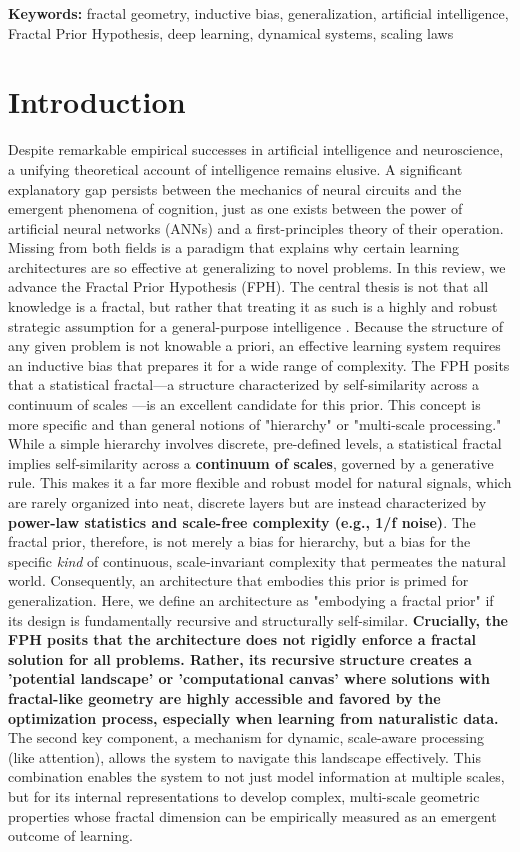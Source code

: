 \documentclass[11pt,a4paper]{article}
\newcommand{\keywords}[1]{%
\begin{center}
\small\textbf{Keywords:} #1
\end{center}
}
\begin{document}
\keywords{fractal geometry, inductive bias, generalization, artificial intelligence, Fractal Prior Hypothesis, deep learning, dynamical systems, scaling laws}

\section{Introduction}
Despite remarkable empirical successes in artificial intelligence and neuroscience, a unifying theoretical account of intelligence remains elusive. A significant explanatory gap persists between the mechanics of neural circuits and the emergent phenomena of cognition, just as one exists between the power of artificial neural networks (ANNs) and a first-principles theory of their operation. Missing from both fields is a paradigm that explains why certain learning architectures are so effective at generalizing to novel problems.
In this review, we advance the Fractal Prior Hypothesis (FPH). The central thesis is not that all knowledge is a fractal, but rather that treating it as such is a highly  and robust strategic assumption for a general-purpose intelligence \citep{marks-tarlow2020fractal}. Because the structure of any given problem is not knowable a priori, an effective learning system requires an inductive bias that prepares it for a wide range of complexity. The FPH posits that a statistical fractal—a structure characterized by self-similarity across a continuum of scales \citep{mandelbrot1983fractal}—is an excellent candidate for this prior. This concept is more specific and  than general notions of "hierarchy" or "multi-scale processing." While a simple hierarchy involves discrete, pre-defined levels, a statistical fractal implies self-similarity across a \textbf{continuum of scales}, governed by a generative rule. This makes it a far more flexible and robust model for natural signals, which are rarely organized into neat, discrete layers but are instead characterized by \textbf{power-law statistics and scale-free complexity (e.g., 1/f noise)}. The fractal prior, therefore, is not merely a bias for hierarchy, but a bias for the specific \textit{kind} of continuous, scale-invariant complexity that permeates the natural world.
Consequently, an architecture that embodies this prior is primed for generalization. Here, we define an architecture as "embodying a fractal prior" if its design is fundamentally recursive and structurally self-similar. \textbf{Crucially, the FPH posits that the architecture does not rigidly enforce a fractal solution for all problems. Rather, its recursive structure creates a 'potential landscape' or 'computational canvas' where solutions with fractal-like geometry are highly accessible and favored by the optimization process, especially when learning from naturalistic data.} The second key component, a mechanism for dynamic, scale-aware processing (like attention), allows the system to navigate this landscape effectively. This combination enables the system to not just model information at multiple scales, but for its internal representations to develop complex, multi-scale geometric properties whose fractal dimension can be empirically measured as an emergent outcome of learning.
\end{document}
